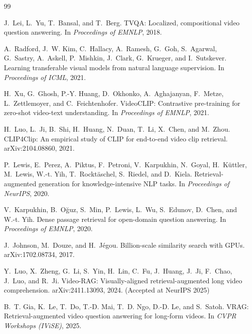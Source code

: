 \documentclass{article}
\begin{document}
\begin{thebibliography}{99}\setlength{\itemsep}{0pt}

J.~Lei, L.~Yu, T.~Bansal, and T.~Berg.
\newblock TVQA: Localized, compositional video question answering.
\newblock In \emph{Proceedings of EMNLP}, 2018.

A.~Radford, J.~W. Kim, C.~Hallacy, A.~Ramesh, G.~Goh, S.~Agarwal, G.~Sastry,
A.~Askell, P.~Mishkin, J.~Clark, G.~Krueger, and I.~Sutskever.
\newblock Learning transferable visual models from natural language supervision.
\newblock In \emph{Proceedings of ICML}, 2021.

H.~Xu, G.~Ghosh, P.-Y. Huang, D.~Okhonko, A.~Aghajanyan, F.~Metze,
L.~Zettlemoyer, and C.~Feichtenhofer.
\newblock VideoCLIP: Contrastive pre-training for zero-shot video-text understanding.
\newblock In \emph{Proceedings of EMNLP}, 2021.

H.~Luo, L.~Ji, B.~Shi, H.~Huang, N.~Duan, T.~Li, X.~Chen, and M.~Zhou.
\newblock CLIP4Clip: An empirical study of CLIP for end-to-end video clip retrieval.
\newblock arXiv:2104.08860, 2021.

P.~Lewis, E.~Perez, A.~Piktus, F.~Petroni, V.~Karpukhin, N.~Goyal, H.~K{\"u}ttler,
M.~Lewis, W.-t. Yih, T.~Rockt{\"a}schel, S.~Riedel, and D.~Kiela.
\newblock Retrieval-augmented generation for knowledge-intensive NLP tasks.
\newblock In \emph{Proceedings of NeurIPS}, 2020.

V.~Karpukhin, B.~O{\u{g}}uz, S.~Min, P.~Lewis, L.~Wu, S.~Edunov, D.~Chen, and W.-t. Yih.
\newblock Dense passage retrieval for open-domain question answering.
\newblock In \emph{Proceedings of EMNLP}, 2020.

J.~Johnson, M.~Douze, and H.~J{\'e}gou.
\newblock Billion-scale similarity search with GPUs.
\newblock arXiv:1702.08734, 2017.

Y.~Luo, X.~Zheng, G.~Li, S.~Yin, H.~Lin, C.~Fu, J.~Huang, J.~Ji, F.~Chao, J.~Luo, and R.~Ji.
\newblock Video-RAG: Visually-aligned retrieval-augmented long video comprehension.
\newblock arXiv:2411.13093, 2024. (Accepted at NeurIPS 2025)

B.~T. Gia, K.~Le, T.~Do, T.-D. Mai, T.~D. Ngo, D.-D. Le, and S.~Satoh.
\newblock VRAG: Retrieval-augmented video question answering for long-form videos.
\newblock In \emph{CVPR Workshops (IViSE)}, 2025.


\end{thebibliography}
\end{document}
